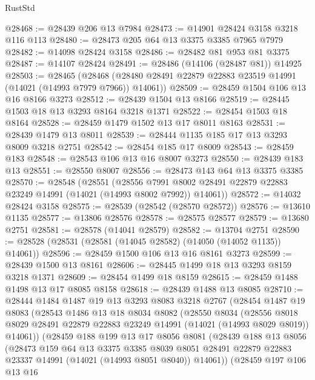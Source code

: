 \begin{lexlean}{RustStd}
\begin{coremodule}
@28468 := @28439 @206 @13 @7984
@28473 := @14901 @28424 @3158 @3218 @116 @113
@28480 := @28473 @205 @64 @13 @3375 @3385 @7965 @7979
@28482 := @14098 @28424 @3158
@28486 := @28482 @81 @953 @81 @3375
@28487 := @14107 @28424
@28491 := @28486 (@14106 (@28487 @81)) @14925
@28503 := @28465
    (@28468 (@28480 @28491 @22879 @22883 @23519 @14991 (@14021 (@14993 @7979 @7966)) @14061))
@28509 := @28459 @1504 @106 @13 @16 @8166 @3273
@28512 := @28439 @1504 @13 @8166
@28519 := @28445 @1503 @18 @13 @3293 @8164 @3218 @1371
@28522 := @28454 @1503 @18 @8164
@28528 := @28459 @1479 @1502 @13 @17 @8011 @8163
@28531 := @28439 @1479 @13 @8011
@28539 := @28444 @1135 @185 @17 @13 @3293 @8009 @3218 @2751
@28542 := @28454 @185 @17 @8009
@28543 := @28459 @183
@28548 := @28543 @106 @13 @16 @8007 @3273
@28550 := @28439 @183 @13
@28551 := @28550 @8007
@28556 := @28473 @143 @64 @13 @3375 @3385
@28570 := @28548
    (@28551
      (@28556 @7991 @8002 @28491 @22879 @22883 @23249 @14991 (@14021 (@14993 @8002 @7992)) @14061))
@28572 := @14032 @28424 @3158
@28575 := @28539 (@28542 (@28570 @28572))
@28576 := @13610 @1135
@28577 := @13806 @28576
@28578 := @28575 @28577
@28579 := @13680 @2751
@28581 := @28578 (@14041 @28579)
@28582 := @13704 @2751
@28590 := @28528 (@28531 (@28581 (@14045 @28582) (@14050 (@14052 @1135)) @14061))
@28596 := @28459 @1500 @106 @13 @16 @8161 @3273
@28599 := @28439 @1500 @13 @8161
@28606 := @28445 @1499 @18 @13 @3293 @8159 @3218 @1371
@28609 := @28454 @1499 @18 @8159
@28615 := @28459 @1488 @1498 @13 @17 @8085 @8158
@28618 := @28439 @1488 @13 @8085
@28710 := @28444
    @1484
    @1487
    @19
    @13
    @3293
    @8083
    @3218
    @2767
    (@28454
      @1487
      @19
      @8083
      (@28543
        @1486
        @13
        @18
        @8034
        @8082
        (@28550
          @8034
          (@28556
            @8018
            @8029
            @28491
            @22879
            @22883
            @23249
            @14991
            (@14021 (@14993 @8029 @8019))
            @14061))
        (@28459
          @188
          @199
          @13
          @17
          @8056
          @8081
          (@28439
            @188
            @13
            @8056
            (@28473
              @159
              @64
              @13
              @3375
              @3385
              @8039
              @8051
              @28491
              @22879
              @22883
              @23337
              @14991
              (@14021 (@14993 @8051 @8040))
              @14061))
          (@28459
            @197
            @106
            @13
            @16

\end{coremodule}
\end{lexlean}
